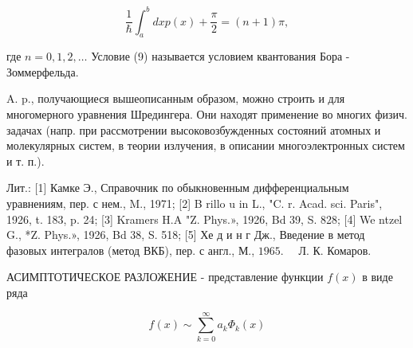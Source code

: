 \documentclass[10pt]{article}
\begin{document}
\[

\frac{1}{\hbar} \int_{a}^{b} d x p(x)+\frac{\pi}{2}=(n+1) \pi,

\]



где $n=0,1,2, \ldots$ Условие (9) называется условием квантования Бора - Зоммерфельда.



A. p., получающиеся вышеописанным образом, можно строить и для многомерного уравнения Шредингера. Они находят применение во многих физич. задачах (напр. при рассмотрении высоковозбужденных состояний атомных и молекулярных систем, в теории излучения, в описании многоэлектронных систем и т. п.).



Лит.: [1] Камке Э., Справочник по обыкновенным дифференциальным уравнениям, пер. с нем., M., 1971; [2] B rillo u in L., "C. r. Acad. sci. Paris", 1926, t. 183, p. 24; [3] Kramers H.A "Z. Phys.», 1926, Bd 39, S. 828; [4] We ntzel G., *Z. Phys.», 1926, Bd 38, S. 518; [5] Хе д и н г Дж., Введение в метод фазовых интегралов (метод ВКБ), пер. с англ., М., $1965 . \quad$ Л. К. Комаров.



АСИМПТОТИЧЕСКОЕ РАЗЛОЖЕНИЕ - представление функции $f(x)$ в виде ряда



\[

f(x) \sim \sum_{k=0}^{\infty} a_{k} \Phi_{k}(x)

\]
\end{document}
